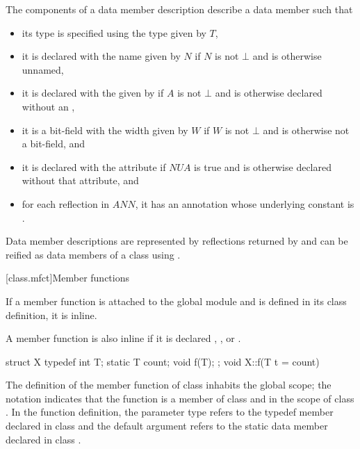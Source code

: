 \begin{note}
The components of a data member description describe a data member such that
\begin{itemize}
\item
its type is specified using the type given by $T$,
\item
it is declared with the name given by $N$
if $N$ is not $\bot$ and is otherwise unnamed,
\item
it is declared with the 
given by 
if $A$ is not $\bot$ and
is otherwise declared without an ,
\item
it is a bit-field with the width given by $W$
if $W$ is not $\bot$ and is otherwise not a bit-field, and
\item
it is declared with
the attribute 
if $\mathit{NUA}$ is true and is otherwise declared without that attribute, and
\item
for each reflection  in $\mathit{ANN}$,
it has an annotation
whose underlying constant is .
\end{itemize}
Data member descriptions are represented by reflections
returned by  and
can be reified as data members of a class using .
\end{note}

[class.mfct]{Member functions}%

\pnum
{}%
%
If a member function is attached to the global module and is defined in its class definition,
it is inline.
\begin{note}
A member function is also inline if it is declared
, , or .
\end{note}

\pnum
{}%
\begin{example}
\begin{codeblock}
struct X {
  typedef int T;
  static T count;
  void f(T);
};
void X::f(T t = count) { }
\end{codeblock}

The definition of the member function  of class  inhabits the global
scope; the notation  indicates that the function 
is a member of class  and in the scope of class . In
the function definition, the parameter type  refers to the
typedef member  declared in class  and the default
argument  refers to the static data member 
declared in class .
\end{example}


